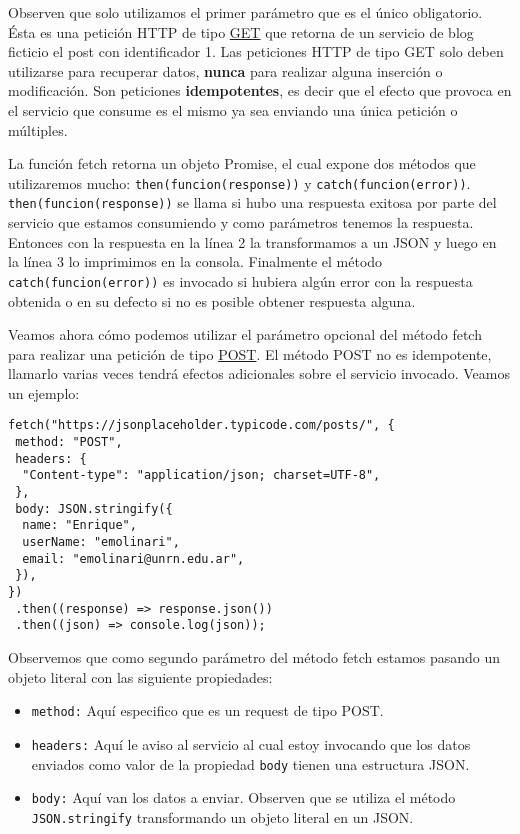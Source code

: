 \documentclass[a4paper, oneside, titlepage, 12pt]{paper}
\begin{document}
Observen que solo utilizamos el primer parámetro que es el único obligatorio. Ésta es una petición HTTP de tipo \href{https://developer.mozilla.org/es/docs/Web/HTTP/Methods/GET}{GET} que retorna de un servicio de blog ficticio el post con identificador 1. Las peticiones HTTP de tipo GET solo deben utilizarse para recuperar datos, \textbf{nunca} para realizar alguna inserción o modificación. Son peticiones \textbf{idempotentes}, es decir que el efecto que provoca en el servicio que consume es el mismo ya sea enviando una única petición o múltiples.
\newline

La función fetch retorna un objeto Promise, el cual expone dos métodos que utilizaremos mucho: \texttt{then(funcion(response))} y \texttt{catch(funcion(error))}. \texttt{then(funcion(response))} se llama si hubo una respuesta exitosa por parte del servicio que estamos consumiendo y como parámetros tenemos la respuesta. Entonces con la respuesta en la línea 2 la transformamos a un JSON y luego en la línea 3 lo imprimimos en la consola. Finalmente el método \texttt{catch(funcion(error))} es invocado si hubiera algún error con la respuesta obtenida o en su defecto si no es posible obtener respuesta alguna.
\newline

Veamos ahora cómo podemos utilizar el parámetro opcional del método fetch para realizar una petición de tipo \href{https://developer.mozilla.org/es/docs/Web/HTTP/Methods/POST}{POST}. El método POST no es idempotente, llamarlo varias veces tendrá efectos adicionales sobre el servicio invocado. Veamos un ejemplo:

\begin{verbatim}
fetch("https://jsonplaceholder.typicode.com/posts/", {
 method: "POST",
 headers: {
  "Content-type": "application/json; charset=UTF-8",
 },
 body: JSON.stringify({
  name: "Enrique",
  userName: "emolinari",
  email: "emolinari@unrn.edu.ar",
 }),
})
 .then((response) => response.json())
 .then((json) => console.log(json));
\end{verbatim}

Observemos que como segundo parámetro del método fetch estamos pasando un objeto literal con las siguiente propiedades:

\begin{itemize}
 \item \texttt{method:} Aquí especifico que es un request de tipo POST. 
 \item \texttt{headers:} Aquí le aviso al servicio al cual estoy invocando que los datos enviados como valor de la propiedad \texttt{body} tienen una estructura JSON. 
 \item \texttt{body:} Aquí van los datos a enviar. Observen que se utiliza el método \texttt{JSON.stringify} transformando un objeto literal en un JSON. 
\end{itemize}
\end{document}
